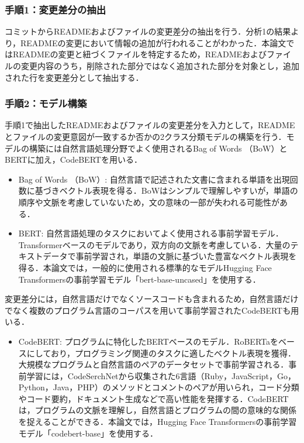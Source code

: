 \documentclass[submit]{ipsj}
\begin{document}
\subsubsection{手順1：変更差分の抽出}
コミットからREADMEおよびファイルの変更差分の抽出を行う．分析1の結果より，READMEの変更において情報の追加が行われることがわかった．本論文ではREADMEの変更と紐づくファイルを特定するため，READMEおよびファイルの変更内容のうち，削除された部分ではなく追加された部分を対象とし，追加された行を変更差分として抽出する．
\subsubsection{手順2：モデル構築}
手順1で抽出したREADMEおよびファイルの変更差分を入力として，READMEとファイルの変更意図が一致するか否かの2クラス分類モデルの構築を行う．モデルの構築には自然言語処理分野でよく使用されるBag of Words （BoW）とBERTに加え，CodeBERTを用いる．

 \begin{itemize}
    \item Bag of Words （BoW）: 自然言語で記述された文書に含まれる単語を出現回数に基づきベクトル表現を得る．BoWはシンプルで理解しやすいが，単語の順序や文脈を考慮していないため，文の意味の一部が失われる可能性がある．

    \item BERT\cite{BERT}: 自然言語処理のタスクにおいてよく使用される事前学習モデル．Transformer\cite{Transfomer}ベースのモデルであり，双方向の文脈を考慮している．大量のテキストデータで事前学習され，単語の文脈に基づいた豊富なベクトル表現を得る．本論文では，一般的に使用される標準的なモデルHugging Face Transformersの事前学習モデル「bert-base-uncased」を使用する．
  \end{itemize}

変更差分には，自然言語だけでなくソースコードも含まれるため，自然言語だけでなく複数のプログラム言語のコーパスを用いて事前学習されたCodeBERTも用いる．

 \begin{itemize}
    \item CodeBERT\cite{CodeBERT}: プログラムに特化したBERTベースのモデル．RoBERTa\cite{RoBERTa}をベースにしており，プログラミング関連のタスクに適したベクトル表現を獲得．大規模なプログラムと自然言語のペアのデータセットで事前学習される．事前学習には，CodeSerchNet\cite{CodeSerchNet}から収集された6言語（Ruby，JavaScript，Go，Python，Java，PHP）のメソッドとコメントのペアが用いられ，コード分類やコード要約，ドキュメント生成などで高い性能を発揮する．CodeBERTは，プログラムの文脈を理解し，自然言語とプログラムの間の意味的な関係を捉えることができる．本論文では，Hugging Face Transformersの事前学習モデル「codebert-base」を使用する．
 \end{itemize}
\end{document}
